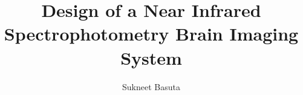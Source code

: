 \title{Design of a Near Infrared Spectrophotometry Brain Imaging System}
\author{Sukneet Basuta}

\prevdegreeone{}

\prevdegreetwo{}



